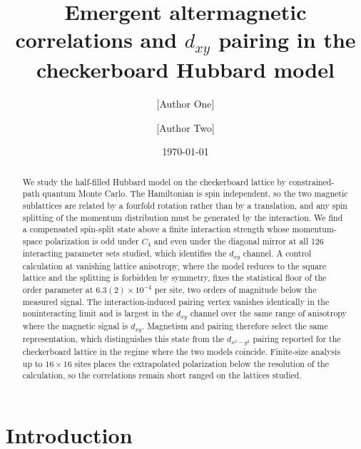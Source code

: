 \documentclass[aps,prb,reprint,superscriptaddress,amsmath,amssymb,floatfix]{revtex4-2}
\begin{document}
\title{Emergent altermagnetic correlations and $d_{xy}$ pairing in the
checkerboard Hubbard model}

\author{[Author One]}
\affiliation{[Affiliation]}
\author{[Author Two]}
\affiliation{[Affiliation]}

\date{\today}

\begin{abstract}
We study the half-filled Hubbard model on the checkerboard lattice by
constrained-path quantum Monte Carlo. The Hamiltonian is spin independent, so
the two magnetic sublattices are related by a fourfold rotation rather than by a
translation, and any spin splitting of the momentum distribution must be
generated by the interaction. We find a compensated spin-split state above a
finite interaction strength whose momentum-space polarization is odd under
$C_4$ and even under the diagonal mirror at all 126 interacting parameter sets
studied, which identifies the $d_{xy}$ channel. A control calculation at
vanishing lattice anisotropy, where the model reduces to the square lattice and
the splitting is forbidden by symmetry, fixes the statistical floor of the order
parameter at $6.3(2)\times10^{-4}$ per site, two orders of magnitude below the
measured signal. The interaction-induced pairing vertex vanishes identically in
the noninteracting limit and is largest in the $d_{xy}$ channel over the same
range of anisotropy where the magnetic signal is $d_{xy}$. Magnetism and pairing
therefore select the same representation, which distinguishes this state from
the $d_{x^2-y^2}$ pairing reported for the checkerboard lattice in the regime
where the two models coincide. Finite-size analysis up to $16\times16$ sites
places the extrapolated polarization below the resolution of the calculation, so the correlations remain short ranged on the lattices studied.
\end{abstract}

\maketitle

\section{Introduction}
\end{document}
